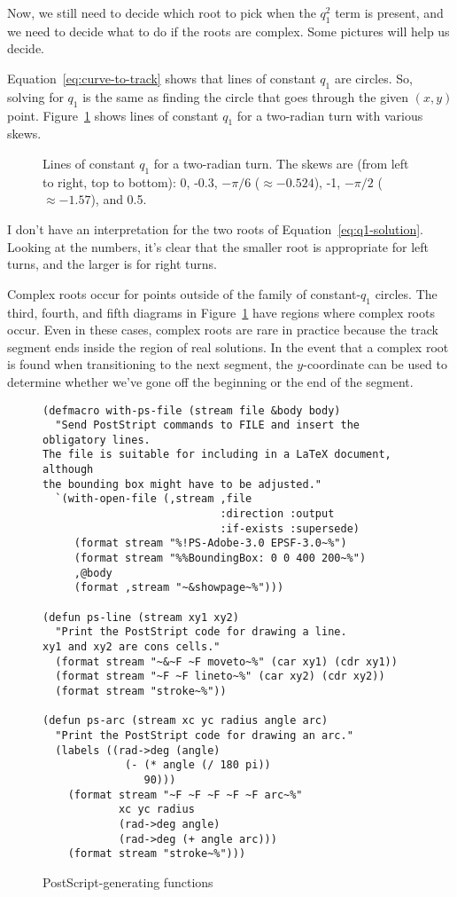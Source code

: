 \documentclass{article}
\begin{document}
Now, we still need to decide which root to pick when the $q_1^2$ term
is present, and we need to decide what to do if the roots are complex.
Some pictures will help us decide.

Equation~\ref{eq:curve-to-track} shows that lines of constant $q_1$
are circles.  So, solving for $q_1$ is the same as finding the circle
that goes through the given $(x, y)$ point.  Figure~\ref{fig:circles}
shows lines of constant $q_1$ for a two-radian turn with various
skews.  

\begin{figure}
  \centering
  \caption{Lines of constant $q_1$ for a two-radian turn.  The skews
    are (from left to right, top to bottom): 0, -0.3, $-\pi/6$
    ($\approx -0.524$), -1, $-\pi/2$ ($\approx -1.57$), and 0.5.}
  \label{fig:circles}
\end{figure}

I don't have an interpretation for the two roots of
Equation~\ref{eq:q1-solution}.  Looking at the numbers, it's clear
that the smaller root is appropriate for left turns, and the larger is
for right turns.  

Complex roots occur for points outside of the family of constant-$q_1$
circles.  The third, fourth, and fifth diagrams in
Figure~\ref{fig:circles} have regions where complex roots occur.  Even
in these cases, complex roots are rare in practice because the track
segment ends inside the region of real solutions.  In the event that a
complex root is found when transitioning to the next segment, the
$y$-coordinate can be used to determine whether we've gone off the
beginning or the end of the segment.

\begin{figure}
  \centering
\begin{verbatim}
(defmacro with-ps-file (stream file &body body)
  "Send PostStript commands to FILE and insert the obligatory lines.
The file is suitable for including in a LaTeX document, although
the bounding box might have to be adjusted."
  `(with-open-file (,stream ,file
                            :direction :output
                            :if-exists :supersede)
     (format stream "%!PS-Adobe-3.0 EPSF-3.0~%")
     (format stream "%%BoundingBox: 0 0 400 200~%")
     ,@body
     (format ,stream "~&showpage~%")))

(defun ps-line (stream xy1 xy2)
  "Print the PostStript code for drawing a line.
xy1 and xy2 are cons cells."
  (format stream "~&~F ~F moveto~%" (car xy1) (cdr xy1))
  (format stream "~F ~F lineto~%" (car xy2) (cdr xy2))
  (format stream "stroke~%"))

(defun ps-arc (stream xc yc radius angle arc)
  "Print the PostStript code for drawing an arc."
  (labels ((rad->deg (angle) 
             (- (* angle (/ 180 pi))
                90)))
    (format stream "~F ~F ~F ~F ~F arc~%" 
            xc yc radius
            (rad->deg angle)
            (rad->deg (+ angle arc)))
    (format stream "stroke~%")))
\end{verbatim}
  \caption{PostScript-generating functions}
\end{figure}
\end{document}
